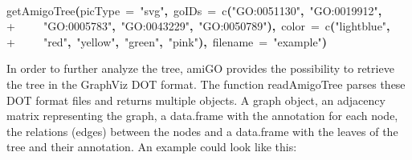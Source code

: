 \documentclass[a4paper,11pt]{article}
\newcommand{\hlfunctioncall}[1]{\textcolor[rgb]{1,0,0}{#1}}%
\newcommand{\hlstring}[1]{\textcolor[rgb]{0.6,0.6,1}{#1}}%
\newcommand{\hlkeyword}[1]{\textcolor[rgb]{0,0,0}{\textbf{#1}}}%
\newcommand{\hlargument}[1]{\textcolor[rgb]{0.694117647058824,0.247058823529412,0.0196078431372549}{#1}}%
\newcommand{\hlprompt}[1]{\textcolor[rgb]{0,0,0}{#1}}%
\newcommand{\hlstd}[1]{\textcolor[rgb]{0,0,0}{#1}}%
\newenvironment{Houtput}{\raggedright}{%
%
}
\begin{document}
\begin{Houtput}
\hspace*{\fill}\\
\hlstd{}\ttfamily\noindent
\hlprompt{\usebox{\hlnormalsizeboxgreaterthan}{\ }}\hlfunctioncall{getAmigoTree}\hlkeyword{(}\hlargument{picType}{\ }\hlargument{=}{\ }\hlstring{"svg"}\hlkeyword{,}{\ }\hlargument{goIDs}{\ }\hlargument{=}{\ }\hlfunctioncall{c}\hlkeyword{(}\hlstring{"GO:0051130"}\hlkeyword{,}{\ }\hlstring{"GO:0019912"}\hlkeyword{,}\hspace*{\fill}\\
\hlstd{}\hlprompt{+{\ }}{\ }{\ }{\ }{\ }\hlstring{"GO:0005783"}\hlkeyword{,}{\ }\hlstring{"GO:0043229"}\hlkeyword{,}{\ }\hlstring{"GO:0050789"}\hlkeyword{)}\hlkeyword{,}{\ }\hlargument{color}{\ }\hlargument{=}{\ }\hlfunctioncall{c}\hlkeyword{(}\hlstring{"lightblue"}\hlkeyword{,}\hspace*{\fill}\\
\hlstd{}\hlprompt{+{\ }}{\ }{\ }{\ }{\ }\hlstring{"red"}\hlkeyword{,}{\ }\hlstring{"yellow"}\hlkeyword{,}{\ }\hlstring{"green"}\hlkeyword{,}{\ }\hlstring{"pink"}\hlkeyword{)}\hlkeyword{,}{\ }\hlargument{filename}{\ }\hlargument{=}{\ }\hlstring{"example"}\hlkeyword{)}\mbox{}
\normalfont
\hspace*{\fill}\\
\hlstd{}
\end{Houtput}

In order to further analyze the tree, amiGO provides the possibility to retrieve the tree in the GraphViz DOT format. The function readAmigoTree parses these DOT format files and returns multiple objects. A graph object, an adjacency matrix representing the graph, a data.frame with the annotation for each node, the relations (edges) between the nodes and a data.frame with the leaves of the tree and their annotation. An example could look like this:
\end{document}
